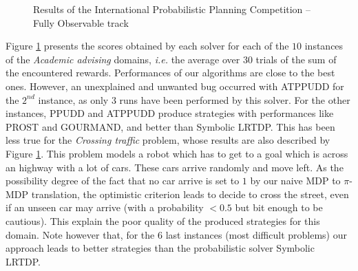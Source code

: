 \begin{figure}
\caption[Results of IPPC 2014: \textit{Academic advising} and \textit{Crossing traffic} problems]{
Results of the International Probabilistic Planning Competition -- Fully Observable track}
\label{figure_IPPC_ACA_CRO}
\end{figure}

Figure \ref{figure_IPPC_ACA_CRO} presents the scores obtained by each solver 
for each of the $10$ instances of the \textit{Academic advising} domains,
\textit{i.e.} the average over $30$ trials of the sum of the encountered rewards.
Performances of our algorithms are close to the best ones.
However, an unexplained and unwanted bug occurred with ATPPUDD for the $2^{nd}$ instance, 
as only $3$ runs have been performed by this solver.
For the other instances, PPUDD and ATPPUDD produce strategies with performances like 
PROST and GOURMAND, and better than Symbolic LRTDP.
This has been less true for the \textit{Crossing traffic} problem, 
whose results are also described by Figure \ref{figure_IPPC_ACA_CRO}.
This problem models a robot which has to get to a goal 
which is across an highway with a lot of cars.
These cars arrive randomly and move left.
As the possibility degree of the fact that no car arrive 
is set to $1$ by our naive MDP to $\pi$-MDP translation,
the optimistic criterion leads to decide to cross the street,
even if an unseen car may arrive (with a probability $<0.5$ but bit enough to be cautious). 
This explain the poor quality of the produced strategies 
for this domain. Note however that, for the $6$ last instances (most difficult problems)
our approach leads to better strategies than the probabilistic solver Symbolic LRTDP.

